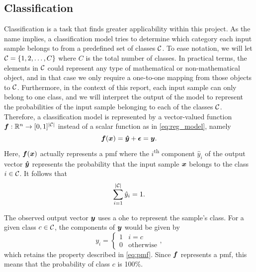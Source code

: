 \documentclass[../main.tex]{subfiles}
\begin{document}
\subsection{Classification}
Classification is a task that finds greater applicability within this project.
As the name implies, a classification model tries to determine which category each input sample belongs to from a predefined set of classes ${\mathcal{C}}$.
To ease notation, we will let ${\mathcal{C}}=\{1, 2, \dots, C\}$ where $C$ is the total number of classes.
In practical terms, the elements in ${\mathcal{C}}$ could represent any type of mathematical or non-mathematical object, and in that case we only require a one-to-one mapping from those objects to ${\mathcal{C}}$.
Furthermore, in the context of this report, each input sample can only belong to one class, and we will interpret the output of the model to represent the probabilities of the input sample belonging to each of the classes ${\mathcal{C}}$.
Therefore, a classification model is represented by a vector-valued function
${\bm{f}} : \mathbb{R}^n \rightarrow [0,1]^{\lvert{\mathcal{C}}\rvert}$
instead of a scalar function as in \cref{eq:reg_model}, namely
\begin{equation}
    \label{eq:cla_model}
    {\bm{f}}({\bm{x}}) = {\bm{\hat{y}}} + \bm{\epsilon}= {\bm{y}}.
\end{equation}
Here, ${\bm{f}}({\bm{x}})$ actually represents a \gls{pmf} where the $i$\textsuperscript{th} component $\hat{y}_i$ of the output vector ${\bm{\hat{y}}}$ represents the probability that the input sample ${\bm{x}}$ belongs to the class $i\in {\mathcal{C}}$.
It follows that
\begin{equation}
    \label{eq:pmf}
    \sum_{i=1}^{\lvert{\mathcal{C}}\rvert} \hat{y}_i = 1.
\end{equation}

The observed output vector ${\bm{y}}$ uses a \gls{ohe} to represent the sample's class. 
For a given class $c \in {\mathcal{C}}$, the components of ${\bm{y}}$ would be given by
\begin{equation*}
    y_i = \begin{cases}
        1 & i=c \\
        0 & \text{otherwise}
    \end{cases},
\end{equation*}
which retains the property described in \cref{eq:pmf}.
Since ${\bm{f}}$ represents a \gls{pmf}, this means that the probability of class $c$ is 100\%.


\end{document}
